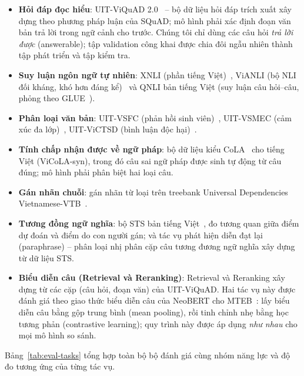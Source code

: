 \begin{itemize}
  \item \textbf{Hỏi đáp đọc hiểu}: UIT-ViQuAD 2.0~\cite{nguyen2022vimrc} -- bộ dữ liệu hỏi
        đáp trích xuất xây dựng theo phương pháp luận của SQuAD; mô hình phải xác định đoạn văn bản trả lời
        trong ngữ cảnh cho trước. Chúng tôi chỉ dùng các câu hỏi \textit{trả lời được}
        (answerable); tập validation công khai được chia đôi ngẫu nhiên thành tập phát
        triển và tập kiểm tra.
  \item \textbf{Suy luận ngôn ngữ tự nhiên}: XNLI (phần tiếng Việt)~\cite{conneau2018xnli},
        ViANLI (bộ NLI đối kháng, khó hơn đáng kể)~\cite{huynh2024vianli} và QNLI bản tiếng
        Việt (suy luận câu hỏi--câu, phỏng theo GLUE~\cite{wang2018glue}).
  \item \textbf{Phân loại văn bản}: UIT-VSFC (phản hồi sinh viên)~\cite{nguyen2018vsfc},
        UIT-VSMEC (cảm xúc đa lớp)~\cite{ho2020vsmec}, UIT-ViCTSD (bình luận độc
        hại)~\cite{nguyen2021victsd}.
  \item \textbf{Tính chấp nhận được về ngữ pháp}: bộ dữ liệu kiểu CoLA~\cite{warstadt2019cola}
        cho tiếng Việt (ViCoLA-syn), trong đó câu sai ngữ pháp được sinh tự động từ câu đúng;
        mô hình phải phân biệt hai loại câu.
  \item \textbf{Gán nhãn chuỗi}: gán nhãn từ loại trên treebank Universal Dependencies
        Vietnamese-VTB~\cite{nguyen2009vtb}.
  \item \textbf{Tương đồng ngữ nghĩa}: bộ STS bản tiếng Việt~\cite{cer2017sts}, đo tương
        quan giữa điểm dự đoán và điểm do con người gán; và tác vụ phát hiện diễn đạt lại (paraphrase) --
        phân loại nhị phân cặp câu tương đương ngữ nghĩa xây dựng từ dữ liệu STS.
  \item \textbf{Biểu diễn câu (Retrieval và Reranking)}: Retrieval và Reranking xây dựng
        từ các cặp (câu hỏi, đoạn văn) của UIT-ViQuAD. Hai tác vụ này được đánh giá theo
        giao thức biểu diễn câu của NeoBERT cho MTEB~\cite{lebreton2025neobert}: lấy biểu
        diễn câu bằng gộp trung bình (mean pooling), rồi tinh chỉnh nhẹ bằng học tương phản
        (contrastive learning); quy trình này được áp dụng \textit{như nhau} cho mọi mô hình so sánh.
\end{itemize}

Bảng~\ref{tab:eval-tasks} tổng hợp toàn bộ bộ đánh giá cùng nhóm năng lực và độ đo
tương ứng của từng tác vụ.

